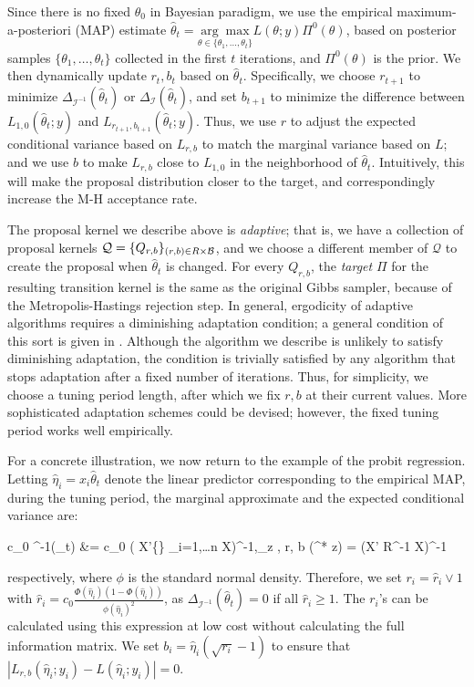 \documentclass[10pt]{article}
\newcommand{\be}{\begin{equs}}
\newcommand{\ee}{\end{equs}}
\newcommand{\bb}[1]{\mathbb{#1}}
\newcommand{\mc}[1]{\mathcal{#1}}
\DeclareMathOperator{\var}{var}
\DeclareMathOperator{\diag}{diag}
\begin{document}
Since there is no fixed $\theta_0$ in Bayesian paradigm, we use the empirical maximum-a-posteriori (MAP) estimate $\hat \theta_{t}= \underset{\theta\in \{ \theta_1, \ldots, \theta_t\}}{\arg\max } L (\theta ; y) \Pi^0(\theta)$, based on posterior samples $\{ \theta_1, \ldots, \theta_t\}$ collected in the first $t$ iterations, and $ \Pi^0(\theta)$ is the prior. We then dynamically update $r_t,b_t$ based on $\hat \theta_{t}$. Specifically, we choose $r_{t+1}$ to minimize $\Delta_{\mc I^{-1}}(\hat \theta_t)$ or $\Delta_{\mc I}(\hat \theta_t)$, and set $b_{t+1}$ to minimize the difference between $L_{1,0}(\hat \theta_t;y)$ and $L_{r_{t+1},b_{t+1}}(\hat \theta_t;y)$. Thus, we use $r$ to adjust the expected conditional variance based on $L_{r,b}$ to match the marginal variance based on $L$; and we use $b$ to make $L_{r,b}$ close to $L_{1,0}$ in the neighborhood of $\hat \theta_t$. Intuitively, this will make the proposal distribution closer to the target, and correspondingly increase the M-H acceptance rate.

The proposal kernel we describe above is \emph{adaptive}; that is, we have a collection of proposal kernels $\mc Q = \{Q_{r,b}\}_{(r,b) \in \bb \mc R \times \mc B}$, and we choose a different member of $\mc Q$ to create the proposal when $\hat \theta_{t}$ is changed. For every $Q_{r,b}$, the \emph{target}  $\Pi$ for the resulting transition kernel is the same as the original Gibbs sampler,  because of the Metropolis-Hastings rejection step.  In general, ergodicity of adaptive algorithms requires a diminishing adaptation condition; a general condition of this sort is given in \cite{roberts2007coupling}. Although the algorithm we describe is unlikely to satisfy diminishing adaptation, the condition is trivially satisfied by any algorithm that stops adaptation after a fixed number of iterations. Thus, for simplicity, we choose a tuning period length, after which we fix $r,b$ at their current values. More sophisticated adaptation schemes could be devised; however, the fixed tuning period works well empirically.


For a concrete illustration, we now return to the example of the probit regression. Letting $\hat\eta_i = x_i \hat\theta_t$ denote the linear predictor corresponding to the empirical MAP, during the tuning period, the marginal approximate and the expected conditional variance are:
\be
c_0 \mc I^{-1}(\hat\theta_t) &= c_0 ( X'\diag\bigg\{\bigg\} _{i=1,\ldots n} X)^{-1},\qquad \bb E_{z \mid \theta, r, b}  \var (\theta^* \mid z) = (X' R^{-1} X)^{-1}
\ee
respectively, where $\phi$ is the standard normal density. Therefore, we set $r_i = \hat r_i \vee 1$ with $\hat r_i= c_0 \frac{\Phi(\hat\eta_i)(1- \Phi(\hat\eta_i))} {\phi(\hat\eta_i)^2}$, as $\Delta_{\mc I^{-1}}(\hat\theta_t)=0$ if all $\hat r_i \ge 1$.  The $r_i$'s can be calculated using this expression at low cost without calculating the full information matrix. We set $b_i = \hat\eta_i (\sqrt{r_i}-1)$ to ensure that $|L_{r,b}(\hat\eta_i;y_i) - L(\hat\eta_i;y_i)|=0$.
\end{document}
